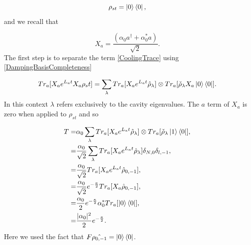 \documentclass[reprint, amsmath,amssymb, aps,pra]{revtex4-1}
\begin{document}
\begin{equation}
\rho_{st} = \Ket{0}\Bra{0},
\end{equation} and we recall that

\begin{equation}
X_a = \frac{(\alpha_0a^{\dagger}+\alpha_0^*a)}{\sqrt{2}}.
\end{equation} The first step is to separate the term \eqref{CoolingTrace} using \eqref{DampingBasisCompleteness}

\begin{equation}
Tr_a[X_ae^{L_at}X_a\rho_st] = \sum_\lambda Tr_a[X_ae^{L_at}\hat{\rho}_\lambda] \otimes Tr_a[\check{\rho}_\lambda X_a\Ket{0}\Bra{0}].
\end{equation} In this context $\lambda$ refers exclusively to the cavity eigenvalues. The $a$ term of $X_a$ is zero when applied to $\rho_{st}$ and so 

\begin{align}
T=& \alpha_0\sum_\lambda Tr_a[X_ae^{L_at}\hat{\rho}_\lambda] \otimes Tr_a[\check{\rho}_\lambda\Ket{1}\Bra{0}],\\
=&\frac{\alpha_0}{\sqrt{2}}\sum_\lambda Tr_a[X_ae^{L_at}\hat{\rho}_\lambda] \delta_{N,0}\delta_{l,-1},\\
=&\frac{\alpha_0}{\sqrt{2}} Tr_a[X_ae^{L_at}\hat{\rho}_{0,-1}],\\
=&\frac{\alpha_0}{\sqrt{2}}e^{-\frac{\kappa}{2}} Tr_a[X_a\hat{\rho}_{0,-1}],\\
=&\frac{\alpha_0}{2}e^{-\frac{\kappa}{2}}\alpha_0^*Tr_a[\Ket{0}\Bra{0}],\\
=&\frac{|\alpha_0|^2}{2}e^{-\frac{\kappa}{2}}.
\end{align} Here we used the fact that $F\hat{\rho_{0,-1}}=\Ket{0}\Bra{0}$. 









\end{document}
